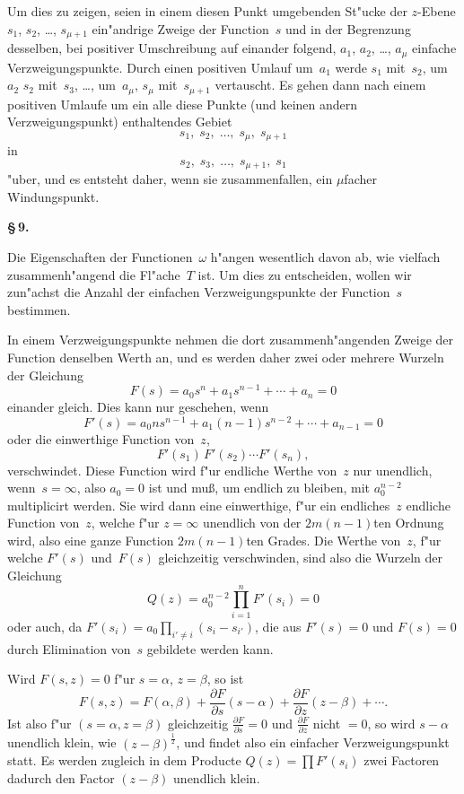 \documentclass[12pt,a4paper]{book}
\theoremstyle{definition}
\theoremstyle{remark}
\begin{document}
Um dies zu zeigen, seien in einem diesen Punkt umgebenden St"ucke der
$z$-Ebene $s_1$, $s_2$, \ldots, $s_{\mu+1}$ ein"andrige Zweige der Function~$s$
und in der Begrenzung desselben, bei positiver Umschreibung auf einander
folgend, $a_1$, $a_2$, \ldots, $a_\mu$ einfache Verzweigungspunkte. Durch einen
positiven Umlauf um~$a_1$ werde $s_1$ mit~$s_2$, um~$a_2$ $s_2$ mit~$s_3$, \ldots,
um~$a_\mu$, $s_\mu$ mit~$s_{\mu+1}$ vertauscht. Es gehen dann nach einem
positiven Umlaufe um ein alle diese Punkte (und keinen andern
Verzweigungspunkt) enthaltendes Gebiet
\[
s_1,\; s_2,\; \ldots,\; s_\mu,\; s_{\mu+1}
\]
in
\[
s_2,\; s_3,\; \ldots,\; s_{\mu+1},\; s_1
\]
"uber, und es entsteht daher, wenn sie zusammenfallen, ein $\mu$facher
Windungspunkt.

\medskip
\textbf{\S\,9.}

Die Eigenschaften der Functionen~$\omega$ h"angen wesentlich davon ab,
wie vielfach zusammenh"angend die Fl"ache~$T$ ist. Um dies zu entscheiden,
wollen wir zun"achst die Anzahl der einfachen Verzweigungspunkte der
Function~$s$ bestimmen.

In einem Verzweigungspunkte nehmen die dort zusammenh"angenden Zweige
der Function denselben Werth an, und es werden daher zwei oder mehrere
Wurzeln der Gleichung
\[
F(s) = a_0 s^n + a_1 s^{n-1} + \cdots + a_n = 0
\]
einander gleich. Dies kann nur geschehen, wenn
\[
F'(s) = a_0 n s^{n-1} + a_1 (n-1) s^{n-2} + \cdots + a_{n-1} = 0
\]
oder die einwerthige Function von~$z$,
\[
F'(s_1)\, F'(s_2) \cdots F'(s_n),
\]
verschwindet. Diese Function wird f"ur endliche Werthe von~$z$ nur unendlich,
 wenn~$s = \infty$, also $a_0 = 0$ ist und mu\ss{}, um endlich zu bleiben,
mit $a_0^{n-2}$ multiplicirt werden. Sie wird dann eine einwerthige, f"ur
ein endliches~$z$ endliche Function von~$z$, welche f"ur $z = \infty$ unendlich
von der $2m(n-1)$ten Ordnung wird, also eine ganze Function
$2m(n-1)$ten Grades. Die Werthe von~$z$, f"ur welche $F'(s)$ und~$F(s)$
gleichzeitig verschwinden, sind also die Wurzeln der Gleichung
\begin{equation}
\label{eq:Q}
Q(z) = a_0^{n-2} \prod_{i=1}^{n} F'(s_i) = 0
\end{equation}
oder auch, da $\displaystyle F'(s_i) = a_0 \prod_{i' \neq i}(s_i - s_{i'})$, die aus
$F'(s) = 0$ und $F(s) = 0$ durch Elimination von~$s$ gebildete werden kann.

Wird $F(s,z) = 0$ f"ur $s = \alpha$, $z = \beta$, so ist
\[
F(s,z) = F(\alpha,\beta) + \frac{\partial F}{\partial s}(s-\alpha)
+ \frac{\partial F}{\partial z}(z-\beta) + \cdots.
\]
Ist also f"ur $(s = \alpha, z = \beta)$ gleichzeitig $\displaystyle\frac{\partial F}{\partial s} = 0$
und $\displaystyle\frac{\partial F}{\partial z}$ nicht $= 0$, so wird $s - \alpha$ unendlich klein, wie
$(z - \beta)^{\frac{1}{2}}$, und findet also ein einfacher Verzweigungspunkt statt.
Es werden zugleich in dem Producte $Q(z) = \prod F'(s_i)$ zwei Factoren
dadurch den Factor $(z - \beta)$ unendlich klein.
\end{document}
